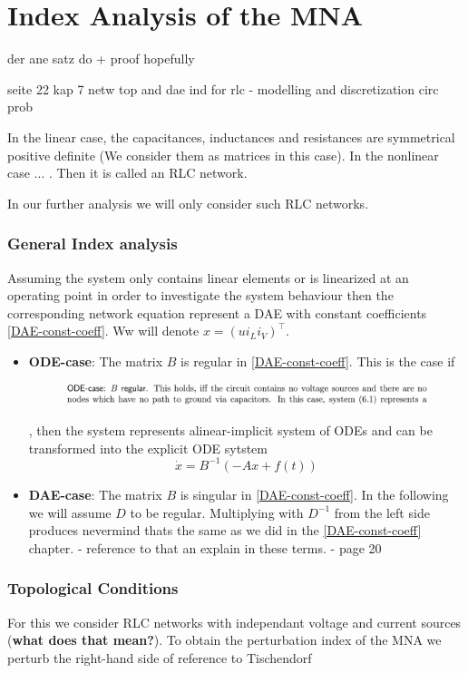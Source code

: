 \chapter{Index Analysis of the MNA}

der ane satz do + proof hopefully

seite 22 kap 7 netw top and dae ind for rlc - modelling and discretization circ prob

In the linear case, the capacitances, inductances and resistances are symmetrical positive definite (We consider them as matrices in this case). In the nonlinear case ... . Then it is called an RLC network.

In our further analysis we will only consider such RLC networks.

\subsection{General Index analysis}

Assuming the system only contains linear elements or is linearized at an operating point in order to investigate the system behaviour then the corresponding network equation represent a DAE with constant coefficients \ref{DAE-const-coeff}. Ww will denote $x=(u i_L i_V)^\top$.

\begin{itemize}
	\item \textbf{ODE-case}: \newline
	The matrix $B$ is regular in \ref{DAE-const-coeff}. This is the case if
	\begin{figure}[H]
		\centering
		\includegraphics[width=0.7\linewidth]{screenshot006}
		\caption{}
		\label{fig:screenshot006}
	\end{figure}
	, then the system represents  alinear-implicit system of ODEs and can be transformed into the explicit ODE sytstem
	\begin{displaymath}
		\dot{x}=B^{-1}(-Ax+f(t))
	\end{displaymath}
	
	\item \textbf{DAE-case}:
	The matrix $B$ is singular in \ref{DAE-const-coeff}. In the following we will assume $D$ to be regular. Multiplying with $D^{-1}$ from the left side produces
	\newline
	nevermind thats the same as we did in the \ref{DAE-const-coeff} chapter. - reference to that an explain in these terms. - page 20
\end{itemize}

\subsection{Topological Conditions}
For this we consider RLC networks with independant voltage and current sources (\textbf{what does that mean?}). To obtain the perturbation index of the MNA we perturb the right-hand side of  
\newline reference to Tischendorf

\cite{Tischendorf2004Topological}